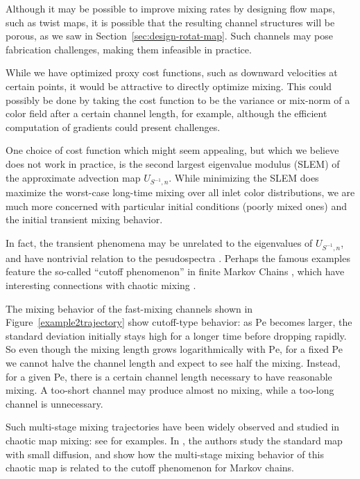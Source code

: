 \documentclass[times]{fldauth}
\begin{document}
Although it may be possible to improve mixing rates by designing flow
maps, such as twist maps, it is possible that the resulting channel
structures will be porous, as we saw in
Section~\ref{sec:design-rotat-map}. Such channels may pose fabrication
challenges, making them infeasible in practice.

While we have optimized proxy cost functions, such as downward
velocities at certain points, it would be attractive to directly
optimize mixing. This could possibly be done by taking the cost
function to be the variance or mix-norm \cite{Mezic2005} of a color
field after a certain channel length, for example, although the
efficient computation of gradients could present challenges.

One choice of cost function which might seem appealing, but which we
believe does not work in practice, is the second largest eigenvalue
modulus (SLEM) \cite{Boyd2004} of the approximate advection map
$U_{S^{-1},n}$. While minimizing the SLEM does maximize the worst-case
long-time mixing over all inlet color distributions, we are much more
concerned with particular initial conditions (poorly mixed ones) and
the initial transient mixing behavior.

In fact, the transient phenomena may be unrelated to the eigenvalues
of $U_{S^{-1},n}$, and have nontrivial relation to the pesudospectra
\cite{Lloyd2005}. Perhaps the famous examples feature the so-called
``cutoff phenomenon'' in finite Markov Chains \cite{Diaconis1996,
  Diaconis2005, LSaloff-Costt2004}, which have interesting connections
with chaotic mixing \cite{numcutoff, symdyn}.

The mixing behavior of the fast-mixing channels shown in
Figure~\ref{example2trajectory} show cutoff-type behavior: as
$\text{Pe}$ becomes larger, the standard deviation initially stays
high for a longer time before dropping rapidly. So even though the
mixing length grows logarithmically with $\text{Pe}$, for a fixed Pe
we cannot halve the channel length and expect to see half the
mixing. Instead, for a given Pe, there is a certain channel length
necessary to have reasonable mixing. A too-short channel may produce
almost no mixing, while a too-long channel is unnecessary.

Such multi-stage mixing trajectories have been widely observed and
studied in chaotic map mixing: see \cite{Thiffeault2003-13,
  Thiffeault2003-309, Thiffeault2004, Tsang2005, Haynes2005} for
examples. In \cite{numcutoff}, the authors study the standard map with
small diffusion, and show how the multi-stage mixing behavior of this
chaotic map is related to the cutoff phenomenon for Markov chains.


%
 

\end{document}
